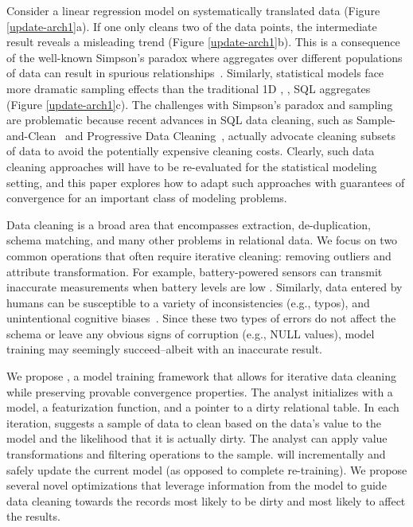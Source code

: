 Consider a linear regression model on systematically translated data (Figure \ref{update-arch1}a).
If one only cleans two of the data points, the intermediate result reveals a misleading trend (Figure \ref{update-arch1}b).
This is a consequence of the well-known Simpson's paradox where aggregates over different populations of data can result in spurious relationships~\cite{simpson1951interpretation}. 
Similarly, statistical models face more dramatic sampling effects than the traditional 1D  \sumfunc, \countfunc, \avgfunc SQL aggregates (Figure \ref{update-arch1}c).
The challenges with Simpson's paradox and sampling are problematic because recent advances in SQL data cleaning, such as Sample-and-Clean~\cite{wang1999sample} and Progressive Data Cleaning~\cite{altowim2014progressive, papenbrock2015progressive, DBLP:journals/pvldb/YakoutENOI11}, actually advocate cleaning subsets of data to avoid the potentially expensive cleaning costs.
Clearly, such data cleaning approaches will have to be re-evaluated for the statistical modeling setting, and this paper explores how to adapt such approaches with guarantees of convergence for an important class of modeling problems. 

Data cleaning is a broad area that encompasses extraction, de-duplication, schema matching, and many other problems in relational data.
We focus on two common operations that often require iterative cleaning: removing outliers and attribute transformation.
For example, battery-powered sensors can transmit inaccurate measurements when battery levels are low \cite{DBLP:conf/pervasive/JefferyAFHW06}. 
Similarly, data entered by humans can be susceptible to a variety of inconsistencies (e.g., typos), and unintentional cognitive biases~\cite{DBLP:conf/recsys/KrishnanPFG14}.
Since these two types of errors do not affect the schema or leave any obvious signs of corruption (e.g., NULL values), model training may seemingly succeed--albeit with an inaccurate result.

We propose \sys, a model training framework that allows for iterative data cleaning while preserving provable convergence properties.
The analyst initializes \sys with a model, a featurization function, and a pointer to a dirty relational table.
In each iteration, \sys suggests a sample of data to clean based on the data's value to the model and the likelihood that it is actually dirty.
The analyst can apply value transformations and filtering operations to the sample. 
\sys will incrementally and safely update the current model (as opposed to complete re-training).
We propose several novel optimizations that leverage information from the model to guide data cleaning towards the records most likely to be dirty and most likely to affect the results.

